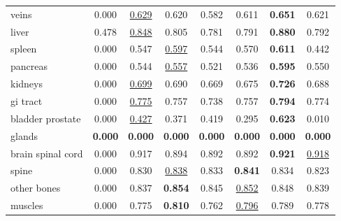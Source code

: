 \begin{minipage}{\textwidth}
{\begin{tabular}{@{}lccccccc@{}}
veins & 0.000 & \underline{0.629} & 0.620 & 0.582 & 0.611 & \textbf{0.651} & 0.621 \\
liver & 0.478 & \underline{0.848} & 0.805 & 0.781 & 0.791 & \textbf{0.880} & 0.792 \\
spleen & 0.000 & 0.547 & \underline{0.597} & 0.544 & 0.570 & \textbf{0.611} & 0.442 \\
pancreas & 0.000 & 0.544 & \underline{0.557} & 0.521 & 0.536 & \textbf{0.595} & 0.550 \\
kidneys & 0.000 & \underline{0.699} & 0.690 & 0.669 & 0.675 & \textbf{0.726} & 0.688 \\
gi tract & 0.000 & \underline{0.775} & 0.757 & 0.738 & 0.757 & \textbf{0.794} & 0.774 \\
bladder prostate & 0.000 & \underline{0.427} & 0.371 & 0.419 & 0.295 & \textbf{0.623} & 0.010 \\
glands & \textbf{0.000} & \textbf{0.000} & \textbf{0.000} & \textbf{0.000} & \textbf{0.000} & \textbf{0.000} & \textbf{0.000} \\
brain spinal cord & 0.000 & 0.917 & 0.894 & 0.892 & 0.892 & \textbf{0.921} & \underline{0.918} \\
spine & 0.000 & 0.830 & \underline{0.838} & 0.833 & \textbf{0.841} & 0.834 & 0.823 \\
other bones & 0.000 & 0.837 & \textbf{0.854} & 0.845 & \underline{0.852} & 0.848 & 0.839 \\
muscles & 0.000 & 0.775 & \textbf{0.810} & 0.762 & \underline{0.796} & 0.789 & 0.778 \\
\bottomrule
\end{tabular}
}\end{minipage}
\par\bigskip
